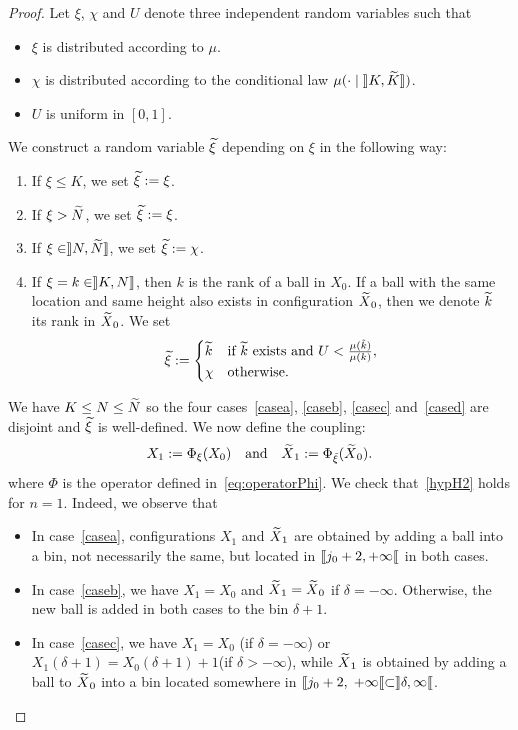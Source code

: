 \documentclass[10pt]{amsart}
\theoremstyle{definition}\newtheorem{defi}[theo]{Definition}\newtheorem{rema}[theo]{Remark}\newtheorem{exam}[theo]{Example}\newtheorem{exem}[theo]{Example}\newtheorem{nota}[theo]{Notation}
\let\oldin\in
\renewcommand{\in}{\mathchoice{\oldin}{\oldin}{\,\oldin\,}{\,\oldin\,}}
\newcommand*{\relabel}{\renewcommand{\labelenumi}{(\theenumi)}}
\newcommand*{\alphenumi}{\renewcommand*{\theenumi}{\alph{enumi}}\relabel}
\let\oldtilde\tilde
\renewcommand*{\tilde}[1]{\mathchoice{\widetilde{#1}}{\widetilde{#1}}{\oldtilde{#1}}{\oldtilde{#1}}}
\newcommand{\llbracket}{\mathopen{[\mkern -2.7mu[}}
\newcommand{\rrbracket}{\mathclose{]\mkern -2.7mu]}}
\newcommand{\llbracketclose}{\mathclose{[\mkern -2.7mu[}}
\newcommand{\rrbracketopen}{\mathopen{]\mkern -2.7mu]}}
\newcommand{\llb}{\llbracket}
\newcommand{\rrb}{\rrbracket}
\begin{document}
\begin{proof}
\goodbreak
Let $\xi$, $\chi$ and $U$ denote three independent random variables such that
\begin{itemize}
\item $\xi$ is distributed according to $\mu$.
\item $\chi$ is distributed according to the conditional law $\mu(\cdot \mid \rrbracketopen K, \tilde{K}\rrb)$.
\item $U$ is uniform in $[0,1]$.
\end{itemize}
We construct a random variable $\tilde{\xi}$ depending on $\xi$ in the following way:
\begin{enumerate}\alphenumi
\item\label{casea} If $\xi \leq K$, we set $\tilde{\xi}
:= \xi$.
\item\label{caseb} If $\xi > \tilde{N}$, we set $\tilde{\xi}
:= \xi$.
\item\label{casec} If $\xi \in \rrb N, \tilde{N}\rrb$, we set $\tilde{\xi}
:= \chi$.
\item\label{cased} If $\xi = k \in \rrb K,N\rrb$, then $k$ is the rank of a ball in $X_0$. If a ball with the same location and same height also exists in configuration $\tilde{X}_0$, then we denote $\tilde{k}$ its rank in $\tilde{X}_0$. We set
\[
\tilde{\xi}
:=
\begin{cases}
\tilde{k} & \text{if }\tilde{k}\text{ exists and }U < \frac{\mu(\tilde{k})}{\mu(k)},\\
\chi & \text{otherwise.}
\end{cases}
\]
\end{enumerate}
We have $K \leq N \leq \tilde{N}$ so the four cases~\eqref{casea}, \eqref{caseb}, \eqref{casec} and~\eqref{cased} are disjoint and $\tilde{\xi}$ is well-defined. We now define the coupling:
\[
X_1
:= \Phi_\xi(X_0) \quad \text{and}\quad \tilde{X}_1
:= \Phi_{\tilde\xi}(\tilde{X}_0).
\]
where $\Phi$ is the operator defined in~\eqref{eq:operatorPhi}. We check that~\eqref{hypH2} holds for $n=1$. Indeed, we observe that
\begin{itemize}
\item In case~\eqref{casea}, configurations $X_1$ and $\tilde{X}_1$ are obtained by adding a ball into a bin, not necessarily the same, but located in $\llb j_0 + 2, +\infty\llbracketclose $ in both cases.
\item In case~\eqref{caseb}, we have $X_1 = X_0$ and $\tilde{X}_1 = \tilde{X}_0$ if $\delta = -\infty$. Otherwise, the new ball is added in both cases to the bin $\delta +1$.
\item In case~\eqref{casec}, we have $X_1 = X_0$ (if $\delta =-\infty$) or $X_1(\delta+1) = X_0(\delta+1)+1$\linebreak (if $\delta > -\infty$), while $\tilde{X}_1$ is obtained by adding a ball to $\tilde{X}_0$ into a bin located somewhere in $\llb j_0+2,\;+\infty\llb \subset \rrb \delta,\infty\llbracketclose$.

\end{itemize}
\end{proof}
\end{document}
